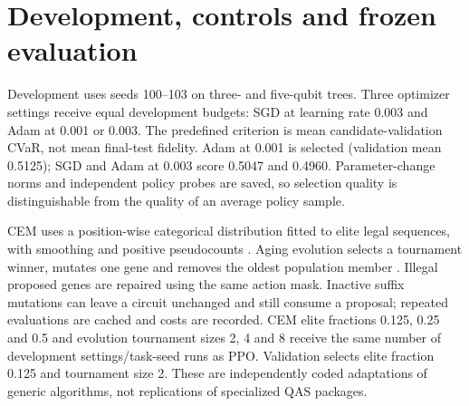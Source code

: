 \documentclass[11pt]{article}
\begin{document}
\section{Development, controls and frozen evaluation}
Development uses seeds 100--103 on three- and five-qubit trees. Three optimizer settings receive equal development budgets: SGD at learning rate 0.003 and Adam \cite{adam} at 0.001 or 0.003. The predefined criterion is mean candidate-validation CVaR, not mean final-test fidelity. Adam at 0.001 is selected (validation mean 0.5125); SGD and Adam at 0.003 score 0.5047 and 0.4960. Parameter-change norms and independent policy probes are saved, so selection quality is distinguishable from the quality of an average policy sample.

CEM uses a position-wise categorical distribution fitted to elite legal sequences, with smoothing and positive pseudocounts \cite{cem}. Aging evolution selects a tournament winner, mutates one gene and removes the oldest population member \cite{evolution}. Illegal proposed genes are repaired using the same action mask. Inactive suffix mutations can leave a circuit unchanged and still consume a proposal; repeated evaluations are cached and costs are recorded. CEM elite fractions 0.125, 0.25 and 0.5 and evolution tournament sizes 2, 4 and 8 receive the same number of development settings/task-seed runs as PPO. Validation selects elite fraction 0.125 and tournament size 2. These are independently coded adaptations of generic algorithms, not replications of specialized QAS packages.
\end{document}
